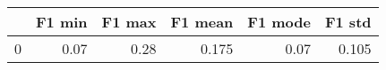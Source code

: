 \begin{tabular}{lrrrrr}
\toprule
{} &  F1 min &  F1 max &  F1 mean &  F1 mode &  F1 std \\
\midrule
0 &    0.07 &    0.28 &    0.175 &     0.07 &   0.105 \\
\bottomrule
\end{tabular}
